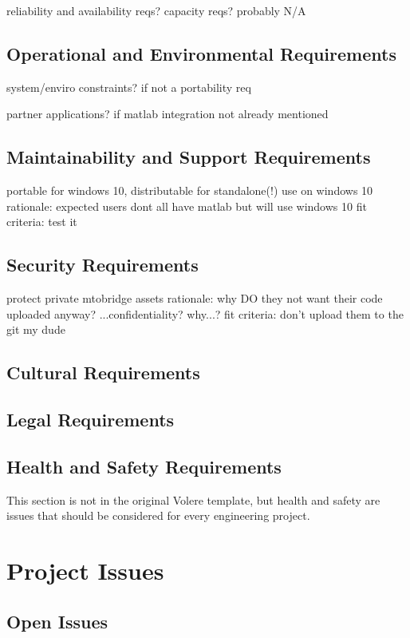 \documentclass[12pt]{article}
\begin{document}
reliability and availability reqs? capacity reqs? probably N/A

\subsection{Operational and Environmental Requirements}

system/enviro constraints? if not a portability req

partner applications? if matlab integration not already mentioned

\subsection{Maintainability and Support Requirements}

portable for windows 10, distributable for standalone(!) use on windows 10
rationale: expected users dont all have matlab but will use windows 10
fit criteria: test it

\subsection{Security Requirements}

protect private mtobridge assets
rationale: why DO they not want their code uploaded anyway? ...confidentiality? why...?
fit criteria: don't upload them to the git my dude

\subsection{Cultural Requirements}

\subsection{Legal Requirements}

\subsection{Health and Safety Requirements}

This section is not in the original Volere template, but health and safety are
issues that should be considered for every engineering project.

\section{Project Issues}

\subsection{Open Issues}
\end{document}
